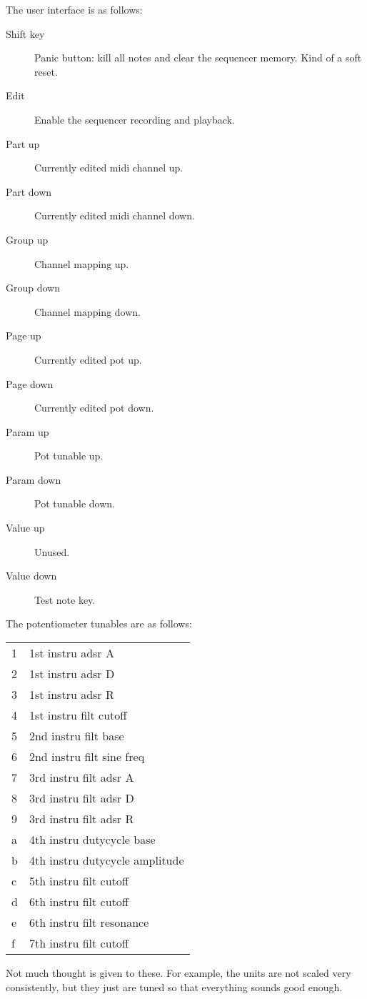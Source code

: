 \documentclass[10pt,a4paper,oneside]{article}
\begin{document}
The user interface is as follows:

\begin{description}
	\item[Shift key] Panic button: kill all notes and clear the sequencer memory. Kind of a soft reset.
	\item[Edit] Enable the sequencer recording and playback.
	\item[Part up] Currently edited midi channel up.
	\item[Part down] Currently edited midi channel down.
	\item[Group up] Channel mapping up.
	\item[Group down] Channel mapping down.
	\item[Page up] Currently edited pot up.
	\item[Page down] Currently edited pot down.
	\item[Param up] Pot tunable up.
	\item[Param down] Pot tunable down.
	\item[Value up] Unused.
	\item[Value down] Test note key.
\end{description}

The potentiometer tunables are as follows:

\begin{tabular}{l l}
1&1st instru adsr A\\
2&1st instru adsr D\\
3&1st instru adsr R\\
4&1st instru filt cutoff\\
5&2nd instru filt base\\
6&2nd instru filt sine freq\\
7&3rd instru filt adsr A\\
8&3rd instru filt adsr D\\
9&3rd instru filt adsr R\\
a&4th instru dutycycle base\\
b&4th instru dutycycle amplitude\\
c&5th instru filt cutoff\\
d&6th instru filt cutoff\\
e&6th instru filt resonance\\
f&7th instru filt cutoff
\end{tabular}

Not much thought is given to these. For example, the units are not scaled very consistently, but they just are tuned so that everything sounds good enough.
\end{document}
